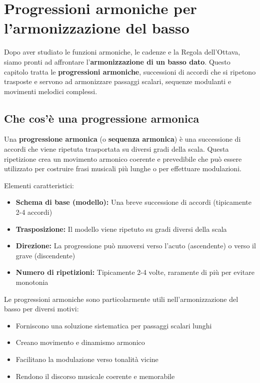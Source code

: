 \chapter{Progressioni armoniche per l'armonizzazione del basso}
\label{chap:progressioni_armoniche}

Dopo aver studiato le funzioni armoniche, le cadenze e la Regola dell'Ottava, siamo pronti ad affrontare l'\textbf{armonizzazione di un basso dato}. Questo capitolo tratta le \textbf{progressioni armoniche}, successioni di accordi che si ripetono trasposte e servono ad armonizzare passaggi scalari, sequenze modulanti e movimenti melodici complessi.

\section{Che cos'è una progressione armonica}
\label{sec:definizione_progressione}

\begin{definizione}
	\label{def:progressione_armonica}
	Una \textbf{progressione armonica} (o \textbf{sequenza armonica}) è una successione di accordi che viene ripetuta trasportata su diversi gradi della scala. Questa ripetizione crea un movimento armonico coerente e prevedibile che può essere utilizzato per costruire frasi musicali più lunghe o per effettuare modulazioni.
	
	Elementi caratteristici:
	\begin{itemize}
		\item \textbf{Schema di base (modello):} Una breve successione di accordi (tipicamente 2-4 accordi)
		\item \textbf{Trasposizione:} Il modello viene ripetuto su gradi diversi della scala
		\item \textbf{Direzione:} La progressione può muoversi verso l'acuto (ascendente) o verso il grave (discendente)
		\item \textbf{Numero di ripetizioni:} Tipicamente 2-4 volte, raramente di più per evitare monotonia
	\end{itemize}
\end{definizione}

Le progressioni armoniche sono particolarmente utili nell'armonizzazione del basso per diversi motivi:

\begin{itemize}
	\item Forniscono una soluzione sistematica per passaggi scalari lunghi
	\item Creano movimento e dinamismo armonico
	\item Facilitano la modulazione verso tonalità vicine
	\item Rendono il discorso musicale coerente e memorabile
\end{itemize}

